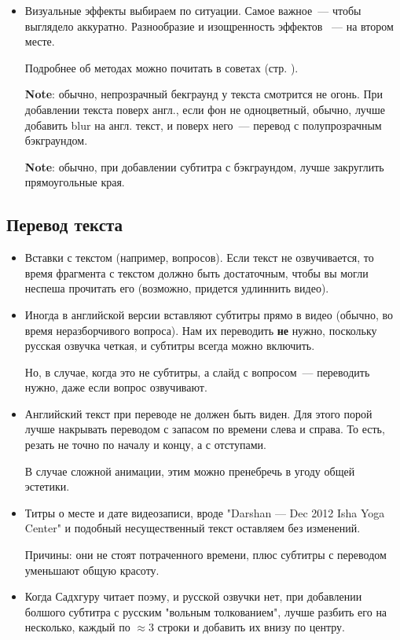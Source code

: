 \documentclass[
a4paper, %
12pt, %
article,
onecolumn, %
openany, %
]{memoir}
\begin{document}
\begin{itemize}
    \item Визуальные эффекты выбираем по ситуации.
        Самое важное~--- чтобы выглядело аккуратно. Разнообразие и изощренность
        эффектов ~--- на втором месте.

        Подробнее об методах можно почитать в советах (стр. \pageref{advices}).

        \textbf{Note}: обычно, непрозрачный бекграунд у текста
        смотрится не огонь. При добавлении текста поверх англ.,
        если фон не одноцветный, обычно, лучше добавить blur на англ.
        текст, и поверх него~--- перевод с полупрозрачным бэкграундом.

        \textbf{Note}: обычно, при добавлении субтитра с
        бэкграундом, лучше закруглить прямоугольные края.
\end{itemize}



\subsection{Перевод текста}

\begin{itemize}

    \item Вставки с текстом (например, вопросов). Если текст не озвучивается,
        то время фрагмента с текстом должно быть достаточным, чтобы вы могли
        неспеша прочитать его (возможно, придется удлиннить видео).

    \item Иногда в английской версии вставляют субтитры прямо в видео
        {\color{gray}(обычно, во время неразборчивого вопроса)}. Нам их переводить
        \textbf{не} нужно, поскольку русская озвучка четкая,
        и субтитры всегда можно включить.

        Но, в случае, когда это не субтитры, а слайд с вопросом~---
        переводить нужно, даже если вопрос озвучивают.
    \item Английский текст при переводе не должен быть виден. Для этого порой лучше
        накрывать переводом с запасом по времени слева и справа. То есть, резать
        не точно по началу и концу, а с отступами.

        В случае сложной анимации, этим можно пренебречь в угоду общей эстетики.


    \item Титры о месте и дате видеозаписи, вроде "Darshan — Dec 2012
        Isha Yoga Center" и подобный несущественный текст оставляем без изменений.

        {\color{gray} Причины: они не стоят потраченного времени, плюс
        субтитры с переводом уменьшают  общую красоту.}

    \item Когда Садхгуру читает поэму, и русской озвучки нет, при добавлении
        болшого субтитра с русским "вольным толкованием", лучше разбить его на
        несколько, каждый
        по $\approx 3$ строки и добавить их внизу по центру.

\end{itemize}
\end{document}
